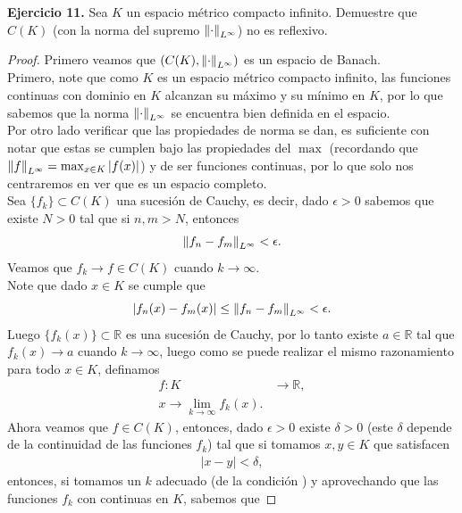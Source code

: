 

\textbf{Ejercicio 11.} Sea $K$ un espacio métrico compacto infinito. Demuestre que $C(K)$ (con la norma del supremo $\left\|\cdot\right\|_{L^\infty}$) no es reflexivo.
\begin{proof}
  Primero veamos que $(C(K),\left\|\cdot\right\|_{L^{\infty}})$ es un espacio de Banach.\\
  Primero, note que como $K$ es un espacio métrico compacto infinito, las funciones continuas con dominio en $K$ alcanzan su máximo y su mínimo en $K$, por lo que sabemos que la norma $\left\|\cdot\right\|_{L^{\infty}}$ se encuentra bien definida en el espacio.\\
  Por otro lado verificar que las propiedades de norma se dan, es suficiente con notar que estas se cumplen bajo las propiedades del $\max$ (recordando que $\left\|f\right\|_{L^{\infty}}=\max_{x\in K}|f(x)|$) y de ser funciones continuas, por lo que solo nos centraremos en ver que es un espacio completo.\\
  Sea $\{f_{k}\}\subset C(K)$ una sucesión de Cauchy, es decir, dado $\epsilon>0$ sabemos que existe $N>0$ tal que si $n,m>N$, entonces
  \begin{align*}
    \left\|f_{n}-f_{m}\right\|_{L^{\infty}}<\epsilon.
  \end{align*}
  Veamos que $f_{k}\to f\in C(K)$ cuando $k\to\infty$.\\
  Note que dado $x\in K$ se cumple que
  \begin{equation}\label{eq:puntual-f}
    |f_{n}(x)-f_{m}(x)|\leq \left\|f_{n}-f_{m}\right\|_{L^\infty}<\epsilon. 
  \end{equation}
  Luego $\{f_{k}(x)\}\subset \mathbb{R}$ es una sucesión de Cauchy, por lo tanto existe $a\in \mathbb{R}$ tal que $f_{k}(x)\to a$ cuando $k\to \infty$, luego como se puede realizar el mismo razonamiento para todo $x\in K$, definamos
  \begin{align*}
    f:K&\to \mathbb{R},\\
      x\to\lim_{k \to \infty}f_{k}(x).
  \end{align*}
  Ahora veamos que $f\in C(K)$, entonces, dado $\epsilon>0$ existe $\delta>0$ (este $\delta$ depende de la continuidad de las funciones $f_{k}$) tal que si tomamos $x,y\in K$ que satisfacen
  \begin{align*}
    |x-y|<\delta,
  \end{align*}
  entonces, si tomamos un $k$ adecuado (de la condición $\label{eq:puntual-f}$) y aprovechando que las funciones $f_{k}$ con continuas en $K$, sabemos que

\end{proof}
